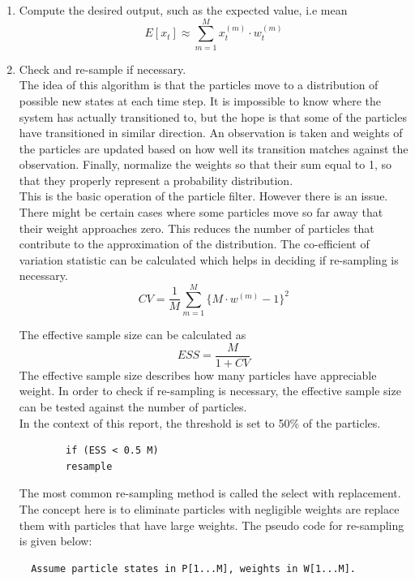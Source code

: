 \documentclass[12pt]{article}
\begin{document}
\begin{enumerate}
	\item Compute the desired output, such as the expected value, i.e mean
	\begin{equation}
		E[x_t] \approx \sum_{m=1}^M x_t^{(m)} \cdot w_t^{(m)}
		\label{eq:exp}
	\end{equation}
	
	\item Check and re-sample if necessary.\\
	The idea of this algorithm is that the particles move to a distribution of possible new states at each time step. It is impossible to know where the system has actually transitioned to, but the hope is that some of the particles have transitioned in similar direction. An observation is taken and weights of the particles are updated based on how well its transition matches against the observation. Finally, normalize the weights so that their sum equal to 1, so that they properly represent a probability distribution. \\
	This is the basic operation of the particle filter. However there is an issue. There might be certain cases where some particles move so far away that their weight approaches zero. This reduces the number of particles that contribute to the approximation of the distribution. The co-efficient of variation statistic can be calculated which helps in deciding if re-sampling is necessary. \\
	\begin{equation}
		CV = \frac{1}{M} \sum_{m=1}^{M}\lbrace M \cdot w^{(m)} - 1 \rbrace ^ 2
		\label{eq:CV}
	\end{equation} 
	
	The effective sample size can be calculated as 
	\begin{equation}
		ESS = \frac{M}{1 + CV}
		\label{eq:ESS}
	\end{equation}
	The effective sample size describes how many particles have appreciable weight. In order to check if re-sampling is necessary, the effective sample size can be tested against the number of particles. \\
	In the context of this report, the threshold is set to 50\% of the particles.
	\begin{verbatim}
  		if (ESS < 0.5 M)
    	resample
	\end{verbatim}	
	
	The most common re-sampling method is called the select with replacement. The concept here is to eliminate particles with negligible weights are replace them with particles that have large weights. The pseudo code for re-sampling is given below:
\begin{verbatim}
  Assume particle states in P[1...M], weights in W[1...M].


\end{verbatim}
\end{enumerate}
\end{document}
